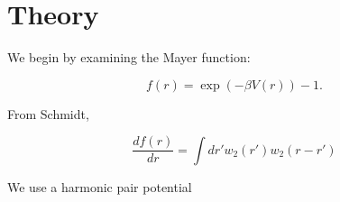 \documentclass[letterpaper,twocolumn,amsmath,amssymb,prb]{revtex4-1}
\begin{document}
\section{Theory}

We begin by examining the Mayer function:

\begin{equation}
f(r) = \exp (-\beta V(r)) - 1.
\end{equation}

From Schmidt\cite{schmidt2000fluid},

\begin{equation}\label{eq:mayerandw2}
\frac{d f(r)}{dr} = \int dr' w_2(r') w_2 (r-r')
\end{equation}


We use a harmonic pair potential
\end{document}
